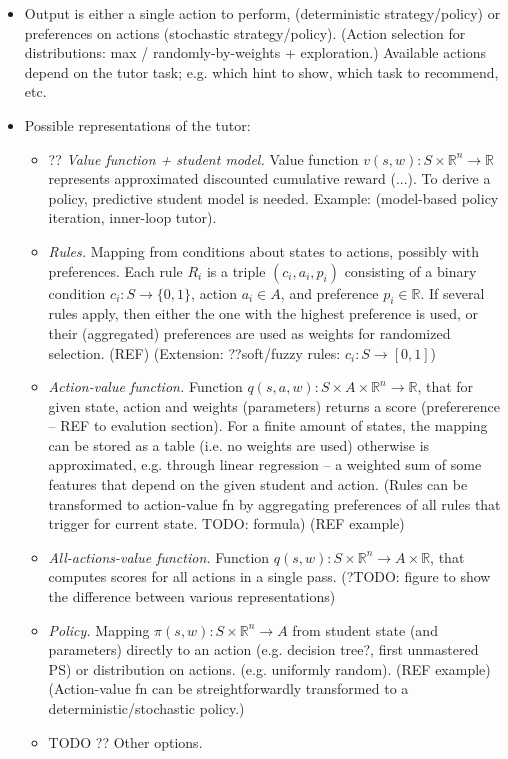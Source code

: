 \begin{itemize}
\item Output is either a single action to perform,
  (deterministic strategy/policy)
  or preferences on actions (stochastic strategy/policy).
  (Action selection for distributions: max / randomly-by-weights +
  exploration.)
  Available actions depend on the tutor task;
  e.g. which hint to show, which task to recommend, etc.
\item Possible representations of the tutor:
\begin{itemize}
\item ?? \emph{Value function + student model.}  %
  Value function $v(s, w): S \times \mathbb{R}^n \rightarrow \mathbb{R}$
  represents approximated discounted cumulative reward (...).
  To derive a policy, predictive student model is needed.
  Example: \cite{rl-for-tutors-evaluation}
  (model-based policy iteration, inner-loop tutor).
\item \emph{Rules.}
  Mapping from conditions about states to actions, possibly with preferences.
  Each rule $R_i$ is a triple $(c_i, a_i, p_i)$
  consisting of a binary condition $c_i: S \rightarrow \{0, 1\}$,
  action $a_i \in A$, and preference $p_i \in \mathbb{R}$.
  If several rules apply, then either the one with the highest preference is used,
  or their (aggregated) preferences are used as weights for randomized selection.
  (REF)
  (Extension: ??soft/fuzzy rules: $c_i: S\rightarrow [0, 1]$)
\item \emph{Action-value function.}  %
  Function $q(s, a, w): S \times A \times \mathbb{R}^n \rightarrow \mathbb{R}$,
  that for given state, action and weights (parameters) returns a score
  (prefererence -- REF to evalution section).
  For a finite amount of states, the mapping can be stored as a table
  (i.e. no weights are used)
  otherwise is approximated, e.g. through linear regression -- a weighted sum
  of some features that depend on the given student and action.
  (Rules can be transformed to action-value fn by aggregating preferences of
  all rules that trigger for current state. TODO: formula)
  (REF example)
\item \emph{All-actions-value function.}
  Function $q(s, w): S \times \mathbb{R}^n \rightarrow A \times \mathbb{R}$,
  that computes scores for all actions in a single pass.
  (?TODO: figure to show the difference between various representations)
\item \emph{Policy.}  %
  Mapping $\pi(s, w): S \times \mathbb{R}^n\rightarrow A$
  from student state (and parameters) directly to an action
  (e.g. decision tree?, first unmastered PS)
  or distribution on actions. (e.g. uniformly random).
  (REF example)
  (Action-value fn can be streightforwardly transformed to a
  deterministic/stochastic policy.)
\item TODO ?? Other options.
\end{itemize}
\end{itemize}


